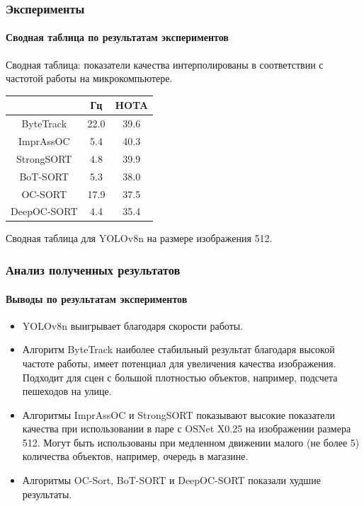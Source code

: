 \documentclass{beamer} %
\begin{document}
\begin{frame}
  \frametitle{Эксперименты}
  \framesubtitle{Сводная таблица по результатам экспериментов}
  Сводная таблица: показатели качества интерполированы в соответствии с частотой работы на микрокомпьютере. 

  \centering
  \large{
  \begin{center}
    \begin{tabular}{ c|c|c } 
     \hline
      & Гц & HOTA \\ 
      \hline
    ByteTrack & 22.0 & 39.6\\
    ImprAssOC & 5.4 & 40.3\\
    StrongSORT & 4.8 & 39.9\\
    BoT-SORT & 5.3 & 38.0\\
    OC-SORT & 17.9 & 37.5\\
    DeepOC-SORT & 4.4 & 35.4\\
     \hline
    \end{tabular}
  \end{center}
  }
  \small Сводная таблица для YOLOv8n на размере изображения 512.
\end{frame}


\begin{frame}
  \frametitle{Анализ полученных результатов}
  \framesubtitle{Выводы по результатам экспериментов}
  \begin{itemize}
    \item YOLOv8n выигрывает благодаря скорости работы.
    \item Алгоритм ByteTrack наиболее стабильный результат благодаря высокой частоте работы, имеет потенциал для увеличения качества изображения. Подходит для сцен с большой плотностью объектов, например, подсчета пешеходов на улице.
    \item Алгоритмы ImprAssOC и StrongSORT показывают высокие показатели качества при использовании в паре с OSNet X0.25 на изображении размера 512. Могут быть использованы при медленном движении малого (не более 5) количества объектов, например, очередь в магазине.
    \item Алгоритмы OC-Sort, BoT-SORT и DeepOC-SORT показали худшие результаты.
  \end{itemize}
\end{frame}
\end{document}
